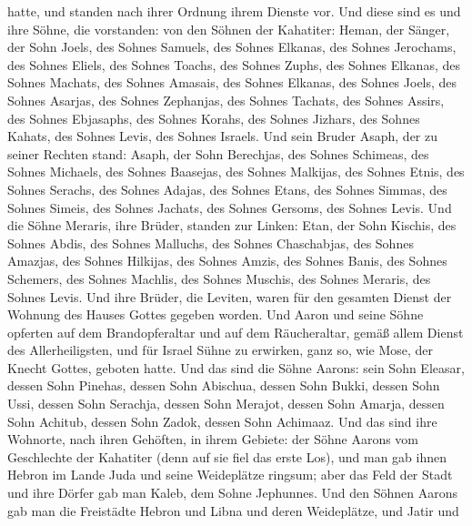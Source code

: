 hatte, und standen nach ihrer Ordnung ihrem Dienste vor. 
Und diese sind es und ihre Söhne, die vorstanden: von den Söhnen der
Kahatiter: Heman, der Sänger, der Sohn Joels, des Sohnes Samuels,
 des Sohnes Elkanas, des Sohnes Jerochams, des Sohnes
Eliels, des Sohnes Toachs,  des Sohnes Zuphs, des Sohnes
Elkanas, des Sohnes Machats, des Sohnes Amasais,  des
Sohnes Elkanas, des Sohnes Joels, des Sohnes Asarjas, des Sohnes
Zephanjas,  des Sohnes Tachats, des Sohnes Assirs, des
Sohnes Ebjasaphs, des Sohnes Korahs,  des Sohnes Jizhars,
des Sohnes Kahats, des Sohnes Levis, des Sohnes Israels. 
Und sein Bruder Asaph, der zu seiner Rechten stand: Asaph, der Sohn
Berechjas, des Sohnes Schimeas,  des Sohnes Michaels, des
Sohnes Baasejas,  des Sohnes Malkijas, des Sohnes Etnis,
des Sohnes Serachs, des Sohnes Adajas,  des Sohnes Etans,
des Sohnes Simmas, des Sohnes Simeis,  des Sohnes
Jachats, des Sohnes Gersoms, des Sohnes Levis.  Und die
Söhne Meraris, ihre Brüder, standen zur Linken: Etan, der Sohn Kischis,
des Sohnes Abdis, des Sohnes Malluchs,  des Sohnes
Chaschabjas, des Sohnes Amazjas, des Sohnes Hilkijas, des Sohnes Amzis,
 des Sohnes Banis, des Sohnes Schemers, 
des Sohnes Machlis, des Sohnes Muschis, des Sohnes Meraris, des Sohnes
Levis.  Und ihre Brüder, die Leviten, waren für den
gesamten Dienst der Wohnung des Hauses Gottes gegeben worden.
 Und Aaron und seine Söhne opferten auf dem
Brandopferaltar und auf dem Räucheraltar, gemäß allem Dienst des
Allerheiligsten, und für Israel Sühne zu erwirken, ganz so, wie Mose,
der Knecht Gottes, geboten hatte.  Und das sind die Söhne
Aarons: sein Sohn Eleasar, dessen Sohn Pinehas, dessen Sohn Abischua,
 dessen Sohn Bukki, dessen Sohn Ussi, dessen Sohn
Serachja,  dessen Sohn Merajot, dessen Sohn Amarja,
dessen Sohn Achitub,  dessen Sohn Zadok, dessen Sohn
Achimaaz.  Und das sind ihre Wohnorte, nach ihren
Gehöften, in ihrem Gebiete: der Söhne Aarons vom Geschlechte der
Kahatiter (denn auf sie fiel das erste Los),  und man gab
ihnen Hebron im Lande Juda und seine Weideplätze ringsum;
 aber das Feld der Stadt und ihre Dörfer gab man Kaleb,
dem Sohne Jephunnes.  Und den Söhnen Aarons gab man die
Freistädte Hebron und Libna und deren Weideplätze, und Jatir und
